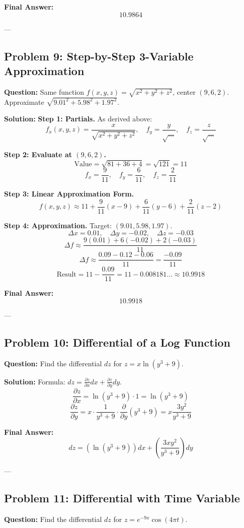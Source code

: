 \documentclass{article}
\begin{document}
\textbf{Final Answer:} \[ 10.9864 \]

---

\subsection*{Problem 9: Step-by-Step 3-Variable Approximation}
\textbf{Question:} Same function $f(x, y, z) = \sqrt{x^2 + y^2 + z^2}$, center $(9, 6, 2)$. Approximate $\sqrt{9.01^2 + 5.98^2 + 1.97^2}$.

\textbf{Solution:}
\textbf{Step 1: Partials.}
As derived above:
\[ f_x(x, y, z) = \frac{x}{\sqrt{x^2+y^2+z^2}}, \quad f_y = \frac{y}{\sqrt{\dots}}, \quad f_z = \frac{z}{\sqrt{\dots}} \]

\textbf{Step 2: Evaluate at $(9, 6, 2)$.}
\[ \text{Value} = \sqrt{81 + 36 + 4} = \sqrt{121} = 11 \]
\[ f_x = \frac{9}{11}, \quad f_y = \frac{6}{11}, \quad f_z = \frac{2}{11} \]

\textbf{Step 3: Linear Approximation Form.}
\[ f(x, y, z) \approx 11 + \frac{9}{11}(x - 9) + \frac{6}{11}(y - 6) + \frac{2}{11}(z - 2) \]

\textbf{Step 4: Approximation.}
Target: $(9.01, 5.98, 1.97)$.
\[ \Delta x = 0.01, \quad \Delta y = -0.02, \quad \Delta z = -0.03 \]
\[ \Delta f \approx \frac{9(0.01) + 6(-0.02) + 2(-0.03)}{11} \]
\[ \Delta f \approx \frac{0.09 - 0.12 - 0.06}{11} = \frac{-0.09}{11} \]
\[ \text{Result} = 11 - \frac{0.09}{11} = 11 - 0.008181... \approx 10.9918 \]

\textbf{Final Answer:} \[ 10.9918 \]

---

\subsection*{Problem 10: Differential of a Log Function}
\textbf{Question:} Find the differential $dz$ for $z = x \ln(y^3 + 9)$.

\textbf{Solution:}
Formula: $dz = \frac{\partial z}{\partial x} dx + \frac{\partial z}{\partial y} dy$.
\[ \frac{\partial z}{\partial x} = \ln(y^3 + 9) \cdot 1 = \ln(y^3 + 9) \]
\[ \frac{\partial z}{\partial y} = x \cdot \frac{1}{y^3 + 9} \cdot \frac{\partial}{\partial y}(y^3 + 9) = x \frac{3y^2}{y^3 + 9} \]

\textbf{Final Answer:}
\[ dz = \left( \ln(y^3 + 9) \right) dx + \left( \frac{3xy^2}{y^3 + 9} \right) dy \]

---

\subsection*{Problem 11: Differential with Time Variable}
\textbf{Question:} Find the differential $dz$ for $z = e^{-9x} \cos(4\pi t)$.
\end{document}
